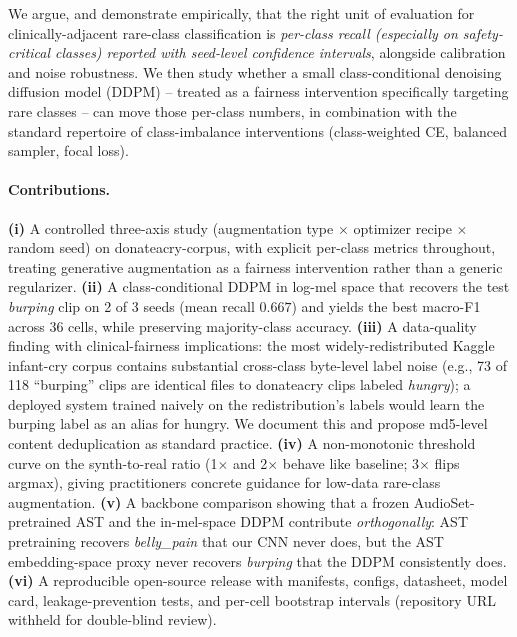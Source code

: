 \documentclass[pmlr,twocolumn,10pt]{jmlr}
\begin{document}
We argue, and demonstrate empirically, that the right unit of evaluation for clinically-adjacent rare-class classification is \emph{per-class recall (especially on safety-critical classes) reported with seed-level confidence intervals}, alongside calibration and noise robustness. We then study whether a small class-conditional denoising diffusion model (DDPM) \citep{ho2020denoising} -- treated as a fairness intervention specifically targeting rare classes -- can move those per-class numbers, in combination with the standard repertoire of class-imbalance interventions (class-weighted CE, balanced sampler, focal loss).

\paragraph{Contributions.}
\textbf{(i)} A controlled three-axis study (augmentation type $\times$ optimizer recipe $\times$ random seed) on donateacry-corpus, with explicit per-class metrics throughout, treating generative augmentation as a fairness intervention rather than a generic regularizer.
\textbf{(ii)} A class-conditional DDPM in log-mel space that recovers the test \textit{burping} clip on 2 of 3 seeds (mean recall $0.667$) and yields the best macro-F1 across 36 cells, while preserving majority-class accuracy.
\textbf{(iii)} A data-quality finding with clinical-fairness implications: the most widely-redistributed Kaggle infant-cry corpus contains substantial cross-class byte-level label noise (e.g., 73 of 118 ``burping'' clips are identical files to donateacry clips labeled \textit{hungry}); a deployed system trained naively on the redistribution's labels would learn the burping label as an alias for hungry. We document this and propose md5-level content deduplication as standard practice.
\textbf{(iv)} A non-monotonic threshold curve on the synth-to-real ratio (1$\times$ and 2$\times$ behave like baseline; 3$\times$ flips argmax), giving practitioners concrete guidance for low-data rare-class augmentation.
\textbf{(v)} A backbone comparison showing that a frozen AudioSet-pretrained AST and the in-mel-space DDPM contribute \emph{orthogonally}: AST pretraining recovers \textit{belly\_pain} that our CNN never does, but the AST embedding-space proxy never recovers \textit{burping} that the DDPM consistently does.
\textbf{(vi)} A reproducible open-source release with manifests, configs, datasheet, model card, leakage-prevention tests, and per-cell bootstrap intervals (repository URL withheld for double-blind review).
\end{document}
